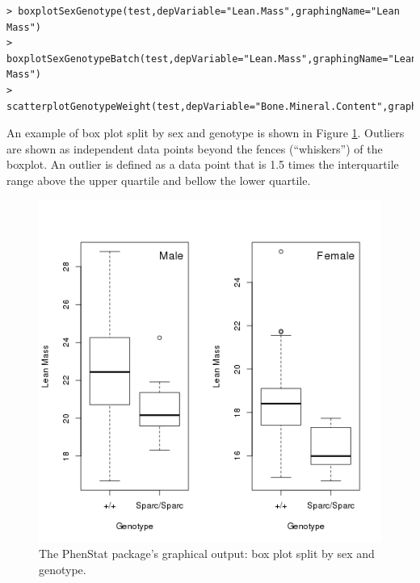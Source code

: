 \documentclass[12pt,a4paper]{article}
\begin{document}
\begingroup
    \fontsize{8pt}{12pt}\selectfont
\begin{verbatim}
> boxplotSexGenotype(test,depVariable="Lean.Mass",graphingName="Lean Mass")
> boxplotSexGenotypeBatch(test,depVariable="Lean.Mass",graphingName="Lean Mass")
> scatterplotGenotypeWeight(test,depVariable="Bone.Mineral.Content",graphingName="BMC")
\end{verbatim}
\endgroup 

An example of box plot split by sex and genotype is shown in Figure \ref{fig:07}. Outliers are shown as independent data points beyond the fences (``whiskers'') of the boxplot. An outlier is defined as a data point that is 1.5 times the interquartile range above the upper quartile and bellow the lower quartile.
\begin{figure}[!htpb]%
\centerline{\includegraphics[scale=0.5]{boxplotSexGenotype.png}}
\caption{The PhenStat package's graphical output: box plot split by sex and genotype.}\label{fig:07}
\end{figure}
\end{document}

